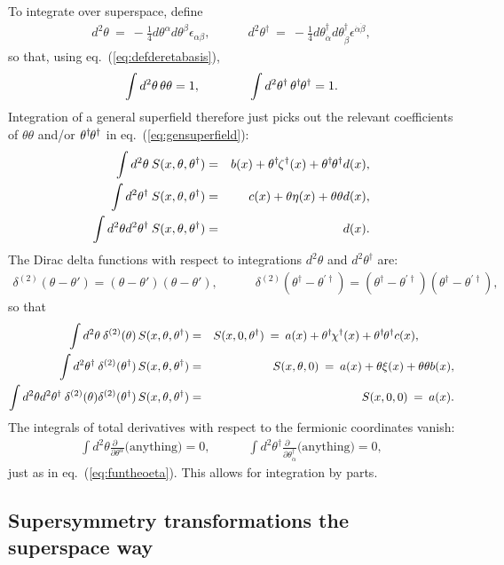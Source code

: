 \documentclass[12pt]{article}
\newcommand{\thdthd}{\theta^\dagger\hspace{-1pt}\theta^\dagger}
\def\beq{\begin{eqnarray}}
\def\eeq{\end{eqnarray}}
\begin{document}
To integrate over superspace, define
\beq
d^2\theta  
\>=\> -\frac{1}{4} d\theta^\alpha d \theta^\beta \epsilon_{\alpha\beta}
,
\qquad\quad
d^2\theta^\dagger \>=\> -\frac{1}{4} d\theta^\dagger_{\dot\alpha} 
d \theta^\dagger_{\dot\beta} 
\epsilon^{\dot\alpha\dot\beta}
,
\eeq
so that, using eq.~(\ref{eq:defderetabasis}),
\beq
\int d^2\theta \,\theta\theta = 1,\qquad\qquad
\int d^2\theta^\dagger \,\thdthd = 1.
\eeq
Integration of a general superfield therefore just picks out the 
relevant coefficients of $\theta\theta$ and/or 
$\thdthd$
in eq.~(\ref{eq:gensuperfield}):
\beq
\int d^2\theta\> S(x, \theta, \theta^\dagger) &=& 
b(x) 
+ \theta^\dagger\hspace{-1pt} \zeta^\dagger (x)
+ \thdthd d(x) ,
\\
\int d^2\theta^\dagger \> S(x, \theta, \theta^\dagger) &=& 
c(x) 
+ \theta \eta(x) 
+ \theta \theta d(x) ,
\\
\int d^2\theta d^2 \theta^\dagger \> S(x, \theta, \theta^\dagger) &=& d(x) .
\label{eq:heckuvajobtimmy}
\eeq
The Dirac delta functions with respect to integrations
$d^2\theta$ and $d^2\theta^\dagger$ are:
\beq
\delta^{(2)} (\theta - \theta') = (\theta - \theta')(\theta - \theta'),
\qquad\quad
\delta^{(2)} (\theta^\dagger - \theta^{\prime\dagger}) = 
(\theta^\dagger - \theta^{\prime\dagger})
(\theta^\dagger - \theta^{\prime\dagger}) ,
\label{eq:deltathetatheta}
\eeq
so that
\beq
\int d^2\theta \> \delta^{(2)}(\theta) \, S(x,\theta,\theta^\dagger) 
&=& S(x,0,\theta^\dagger) 
\>=\> 
a(x) + \theta^\dagger\hspace{-1pt} \chi^\dagger (x) + 
\thdthd c(x) ,
\phantom{xxxxx}
\\
\int d^2\theta^\dagger \> \delta^{(2)}(\theta^\dagger) \, 
S(x,\theta,\theta^\dagger) 
&=& 
S(x,\theta,0) 
\> = \>
a(x) + \theta \xi(x) + \theta\theta b(x) ,
\\
\int d^2\theta d^2\theta^\dagger \> 
\delta^{(2)}(\theta)\delta^{(2)}(\theta^\dagger) \, 
S(x,\theta,\theta^\dagger) 
&=& 
S(x,0,0) 
\>=\>
a(x).
\eeq
The integrals of total derivatives with respect to the fermionic 
coordinates vanish:
\beq
\int d^2\theta 
\frac{\partial\phantom{x}}{\partial\theta^{\alpha}} \mbox{(anything)} = 0
,
\qquad\quad
\int d^2\theta^\dagger 
\frac{\partial\phantom{x}}{\partial\theta^\dagger_{\dot\alpha}} 
\mbox{(anything)} = 0,
\label{eq:totalthetaderivsvanish}
\eeq
just as in eq.~(\ref{eq:funtheoeta}). This allows for integration by parts.


\subsection{Supersymmetry transformations the superspace 
way\label{subsec:superspacetransformations}}
\setcounter{footnote}{2}
\setcounter{equation}{0}
\end{document}
